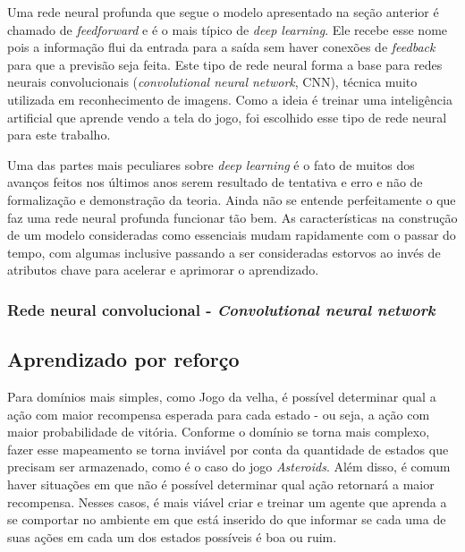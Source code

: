 Uma rede neural profunda que segue o modelo apresentado na seção anterior é chamado de \textit{feedforward} e é o mais típico de \textit{deep learning}. Ele recebe esse nome pois a informação flui da entrada para a saída sem haver conexões de \textit{feedback} para que a previsão seja feita. Este tipo de rede neural forma a base para redes neurais convolucionais (\textit{convolutional neural network}, CNN), técnica muito utilizada em reconhecimento de imagens. Como a ideia é treinar uma inteligência artificial que aprende vendo a tela do jogo, foi escolhido esse tipo de rede neural para este trabalho.

Uma das partes mais peculiares sobre \textit{deep learning} é o fato de muitos dos avanços feitos nos últimos anos serem resultado de tentativa e erro e não de formalização e demonstração da teoria. Ainda não se entende perfeitamente o que faz uma rede neural profunda funcionar tão bem. As características na construção de um modelo consideradas como essenciais mudam rapidamente com o passar do tempo, com algumas inclusive passando a ser consideradas estorvos ao invés de atributos chave para acelerar e aprimorar o aprendizado.

\subsubsection{Rede neural convolucional - \textit{Convolutional neural network}}
\label{sec:cnn}



\subsection{Aprendizado por reforço}
\label{sec:rl}

Para domínios mais simples, como Jogo da velha, é possível determinar qual a ação com maior recompensa esperada para cada estado - ou seja, a ação com maior probabilidade de vitória.
Conforme o domínio se torna mais complexo, fazer esse mapeamento se torna inviável por conta da quantidade de estados que precisam ser armazenado, como é o caso do jogo \textit{Asteroids}. Além disso, é comum haver situações em que não é possível determinar qual ação retornará a maior recompensa.
Nesses casos, é mais viável criar e treinar um agente que aprenda a se comportar no ambiente em que está inserido do que informar se cada uma de suas ações em cada um dos estados possíveis é boa ou ruim.

